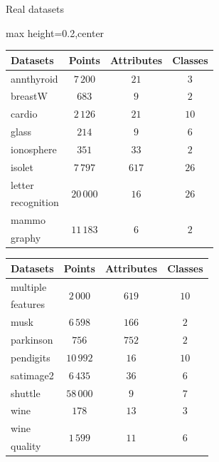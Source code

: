 \documentclass[aspectratio=169,dvipsnames]{beamer}
\begin{document}
\begin{frame}{Real datasets}
	\begin{adjustbox}{max height=0.2\textheight,center}
	\begin{tabular}{|l|c|c|c|}
		\hline
		\textbf{Datasets} & \textbf{Points} & \textbf{Attributes} & \textbf{Classes} \\
		\hline
		annthyroid & $7\,200$ & $21$ & $3$ \\
		breastW & $683$ & $9$ & $2$ \\
		cardio & $2\,126$ & $21$ & $10$ \\
		glass & $214$ & $9$ & $6$ \\
		ionosphere & $351$ & $33$ & $2$ \\
		isolet & $7\,797$ & $617$ & $26$ \\
		letter & \multirow{2}{*}{$20\,000$} & \multirow{2}{*}{$16$} & \multirow{2}{*}{$26$} \\
		recognition & & & \\
		mammo\- & \multirow{2}{*}{$11\,183$} & \multirow{2}{*}{$6$} & \multirow{2}{*}{$2$} \\
		graphy & & & \\
		\hline
	\end{tabular}
	\hspace{0.25cm}
	\begin{tabular}{|l|c|c|c|}
		\hline
		\textbf{Datasets} & \textbf{Points} & \textbf{Attributes} & \textbf{Classes} \\
		\hline
		multiple & \multirow{2}{*}{$2\,000$} & \multirow{2}{*}{$619$} & \multirow{2}{*}{$10$} \\
		features & & & \\
		musk & $6\,598$ & $166$ & $2$ \\
		parkinson & $756$ & $752$ & $2$ \\
		pendigits & $10\,992$ & $16$ & $10$ \\
		satimage2 & $6\,435$ & $36$ & $6$ \\
		shuttle & $58\,000$ & $9$ & $7$ \\
		wine & $178$ & $13$ & $3$ \\
		wine\- & \multirow{2}{*}{$1\,599$} & \multirow{2}{*}{$11$} & \multirow{2}{*}{$6$} \\
		quality & & & \\
		\hline
	\end{tabular}
	\end{adjustbox}
\end{frame}
\end{document}
